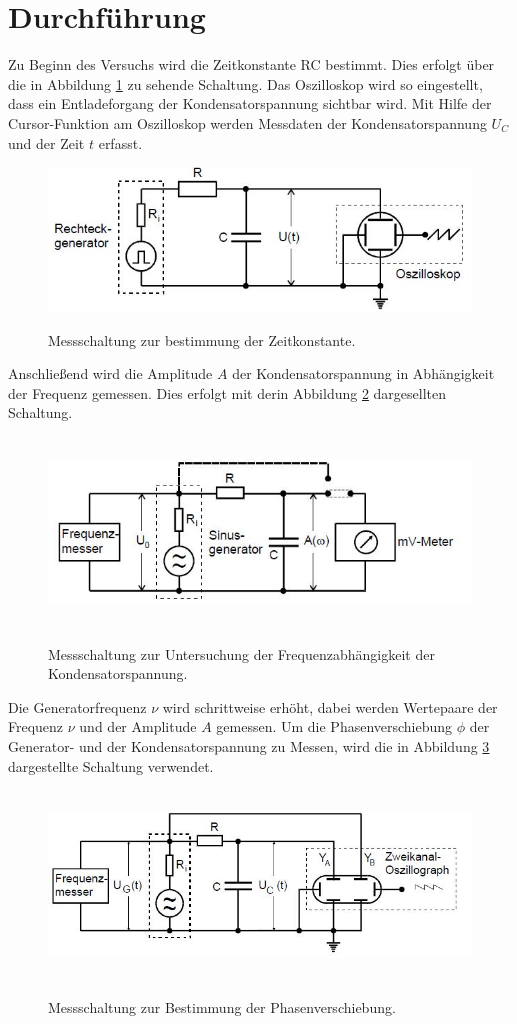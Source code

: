 \section{Durchführung}
Zu Beginn des Versuchs wird die Zeitkonstante RC bestimmt. Dies erfolgt über die in
Abbildung \ref{fig:RC2} zu sehende Schaltung. Das Oszilloskop wird so eingestellt, dass
ein Entladeforgang der Kondensatorspannung sichtbar wird. Mit Hilfe der
Cursor-Funktion am Oszilloskop werden Messdaten der Kondensatorspannung $U_{C}$ und
der Zeit $t$ erfasst.
\begin{figure}[H]
  \centering
  \includegraphics{RC2.JPG}
  \caption[height=5cm]{Messschaltung zur bestimmung der Zeitkonstante.}
  \cite{skript}
  \label{fig:RC2}
\end{figure}
\label{sec:Durchführung}
\noindent Anschließend wird die Amplitude $A$ der Kondensatorspannung in Abhängigkeit der
Frequenz gemessen. Dies erfolgt mit derin Abbildung \ref{fig:RC3} dargesellten Schaltung.
\begin{figure}[H]
  \centering
  \includegraphics[height=5cm]{RC3.JPG}
  \caption{Messschaltung zur Untersuchung der Frequenzabhängigkeit der Kondensatorspannung.}
  \cite{skript}
  \label{fig:RC3}
\end{figure}
\noindent Die Generatorfrequenz $\nu$ wird schrittweise erhöht, dabei werden Wertepaare der
Frequenz $\nu$ und der Amplitude $A$ gemessen.
Um die Phasenverschiebung $\phi$ der Generator- und der Kondensatorspannung zu Messen,
wird die in Abbildung \ref{fig:RC4} dargestellte Schaltung verwendet.
\begin{figure}[H]
  \centering
  \includegraphics[height=5cm]{RC4.JPG}
  \caption{Messschaltung zur Bestimmung der Phasenverschiebung.}
  \cite{skript}
  \label{fig:RC4}
\end{figure}
